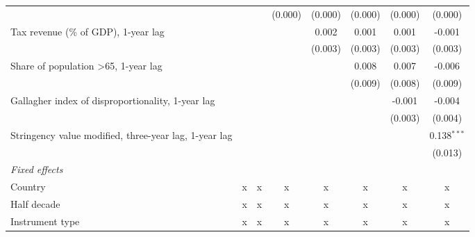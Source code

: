 \begin{tabular}{lccccccc}
                                                                            &               &               & (0.000)       & (0.000)       & (0.000)       & (0.000)       & (0.000)\\   
   Tax revenue (\% of GDP), 1-year lag                                      &               &               &               & 0.002         & 0.001         & 0.001         & -0.001\\   
                                                                            &               &               &               & (0.003)       & (0.003)       & (0.003)       & (0.003)\\   
   Share of population >65, 1-year lag                                      &               &               &               &               & 0.008         & 0.007         & -0.006\\   
                                                                            &               &               &               &               & (0.009)       & (0.008)       & (0.009)\\   
   Gallagher index of disproportionality, 1-year lag                        &               &               &               &               &               & -0.001        & -0.004\\   
                                                                            &               &               &               &               &               & (0.003)       & (0.004)\\   
   Stringency value modified, three-year lag, 1-year lag                    &               &               &               &               &               &               & 0.138$^{***}$\\   
                                                                            &               &               &               &               &               &               & (0.013)\\   
   \emph{Fixed effects}\\
   Country                                                                  & x             & x             & x             & x             & x             & x             & x\\  
   Half decade                                                              & x             & x             & x             & x             & x             & x             & x\\  
   Instrument type                                                          & x             & x             & x             & x             & x             & x             & x\\  

\end{tabular}
